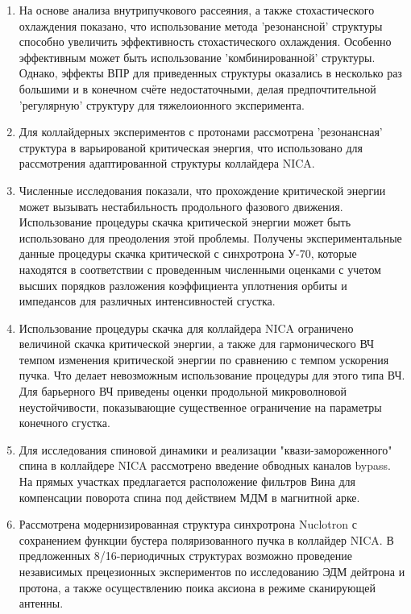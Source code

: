 \begin{enumerate}
  \item На основе анализа внутрипучкового рассеяния, а также стохастического охлаждения показано, что использование метода 'резонансной' структуры способно увеличить эффективность стохастического охлаждения. Особенно эффективным может быть использование 'комбинированной' структуры. Однако, эффекты ВПР для приведенных структуры оказались в несколько раз большими и в конечном счёте недостаточными, делая предпочтительной 'регулярную' структуру для тяжелоионного эксперимента.
  \item Для коллайдерных экспериментов с протонами рассмотрена 'резонансная' структура в варьированой критическая энергия, что использовано для рассмотрения адаптированной структуры коллайдера NICA.
  \item Численные исследования показали, что прохождение критической энергии может вызывать нестабильность продольного фазового движения. Использование процедуры скачка критической энергии может быть использовано для преодоления этой проблемы. Получены экспериментальные данные процедуры скачка критической с синхротрона У-70, которые находятся в соответствии с проведенным численными оценками с учетом высших порядков разложения коэффициента уплотнения орбиты и импедансов для различных интенсивностей сгустка.
  \item Использование процедуры скачка для коллайдера NICA ограничено величиной скачка критической энергии, а также для гармонического ВЧ темпом изменения критической энергии по сравнению с темпом ускорения пучка. Что делает невозможным использование процедуры для этого типа ВЧ. Для барьерного ВЧ приведены оценки продольной микроволновой неустойчивости, показывающие существенное ограничение на параметры конечного сгустка.
  \item Для исследования спиновой динамики и реализации "квази-замороженного" спина в коллайдере NICA рассмотрено введение обводных каналов bypass. На прямых участках предлагается расположение фильтров Вина для компенсации поворота спина под действием МДМ в магнитной арке.
  \item Рассмотрена модернизированная структура синхротрона Nuclotron с сохранением функции бустера поляризованного пучка в коллайдер NICA. В предложенных 8/16-периодичных структурах возможно проведение независимых прецезионных экспериментов по исследованию ЭДМ дейтрона и протона, а также осуществлению поика аксиона в режиме сканирующей антенны.
\end{enumerate}
